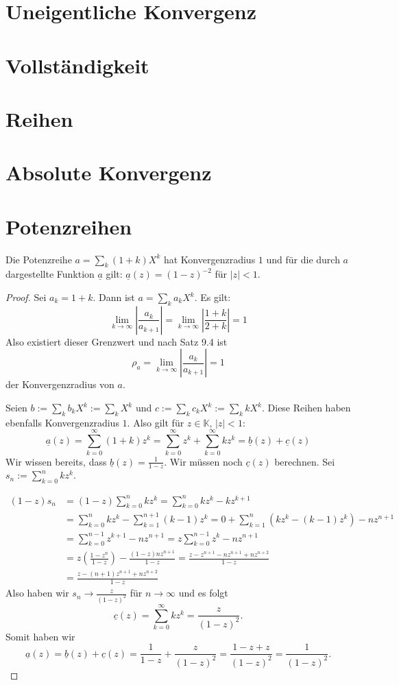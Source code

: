\section{Uneigentliche Konvergenz}
\section{Vollständigkeit}
\section{Reihen}
\section{Absolute Konvergenz}
\section{Potenzreihen}

\setcounter{aufgabe}{1}
\begin{aufgabe}
Die Potenzreihe $a = \sum_k (1+k) X^k$ hat Konvergenzradius $1$ und
für die durch $a$ dargestellte Funktion $\underline a$ gilt: 
$\underline{a}(z) = (1-z)^{-2}$ für $|z| < 1$.
\end{aufgabe}
\begin{proof}
Sei $a_k = 1+k$. Dann ist $a = \sum_k a_k X^k$. Es gilt:
\[
\lim_{k \to \infty} \left| \frac{a_k}{a_{k+1}} \right| = \lim_{k \to \infty}
	\left| \frac{1+k}{2+k} \right| = 1
\]
Also existiert dieser Grenzwert und nach Satz 9.4 ist
\[
\rho_a = \lim_{k \to \infty} \left| \frac{a_k}{a_{k+1}} \right| = 1
\]
der Konvergenzradius von $a$.

Seien $b := \sum_k b_k X^k := \sum_k X^k$ und $c := \sum_k c_k X^k := \sum_k k X^k$.
Diese Reihen haben ebenfalls Konvergenzradius $1$. Also gilt für $z \in \mathbb K$, 
$|z| < 1$:
\[
\underline a(z) = \sum_{k=0}^\infty (1+k) z^k = \sum_{k=0}^\infty z^k + \sum_{k=0}^\infty k z^k
	= \underline b(z) + \underline c(z)
\]
Wir wissen bereits, dass $\underline b(z) = \frac{1}{1-z}$. Wir müssen noch $\underline c(z)$
berechnen. Sei $s_n := \sum_{k=0}^n k z^k$.

\begin{align*}
(1-z) s_n &= (1-z) \sum_{k=0}^n k z^k = \sum_{k=0}^n kz^k - k z^{k+1} \\
					&= \sum_{k=0}^n k z^k - \sum_{k=1}^{n+1} (k-1) z^k
					= 0 + \sum_{k=1}^n ( k z^k - (k-1) z^k ) - n z^{n+1} \\
					&= \sum_{k=0}^{n-1} z^{k+1} - n z^{n+1} = z \sum_{k=0}^{n-1} z^k - n z^{n+1} \\
					&= z \left( \frac{1-z^n}{1-z} \right) - \frac{(1-z) n z^{n+1}}{1-z}
					= \frac{z - z^{n+1} - n z^{n+1} + n z^{n+2}}{1-z} \\
					&= \frac{z - (n+1) z^{n+1} + n z^{n+2}}{1-z}
\end{align*}
Also haben wir $s_n \to \frac{z}{(1-z)^2}$ für $n \to \infty$ und es folgt
\[
\underline c(z) = \sum_{k=0}^\infty k z^k = \frac{z}{(1-z)^2} .
\]
Somit haben wir
\[
\underline a(z) = \underline b(z) + \underline c(z) = \frac{1}{1-z} + \frac{z}{(1-z)^2}
	= \frac{1 -z + z}{(1-z)^2} = \frac{1}{(1-z)^2} .
\]
\end{proof}

